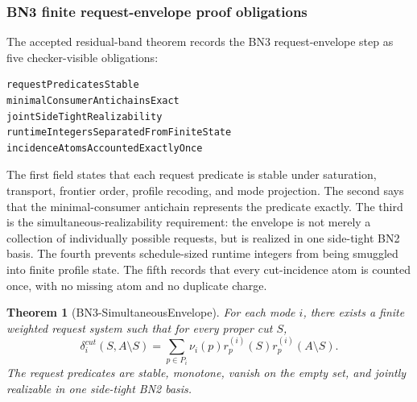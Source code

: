 \documentclass[10.5pt,a4paper]{article}
\newtheorem{theorem}{Theorem}[section]
\begin{document}
\subsubsection{BN3 finite request-envelope proof obligations}
The accepted residual-band theorem records the BN3 request-envelope step as five checker-visible obligations:
\begin{lstlisting}
requestPredicatesStable
minimalConsumerAntichainsExact
jointSideTightRealizability
runtimeIntegersSeparatedFromFiniteState
incidenceAtomsAccountedExactlyOnce
\end{lstlisting}
The first field states that each request predicate is stable under saturation, transport, frontier order, profile recoding, and mode projection.  The second says that the minimal-consumer antichain represents the predicate exactly.  The third is the simultaneous-realizability requirement: the envelope is not merely a collection of individually possible requests, but is realized in one side-tight BN2 basis.  The fourth prevents schedule-sized runtime integers from being smuggled into finite profile state.  The fifth records that every cut-incidence atom is counted once, with no missing atom and no duplicate charge.

\begin{theorem}[BN3-SimultaneousEnvelope]
For each mode \(i\), there exists a finite weighted request system such that for every proper cut \(S\),
\[
\delta_i^{cut}(S,A\setminus S)=
\sum_{p\in P_i}\nu_i(p)r_p^{(i)}(S)r_p^{(i)}(A\setminus S).
\]
The request predicates are stable, monotone, vanish on the empty set, and jointly realizable in one side-tight BN2 basis.
\end{theorem}
\end{document}
